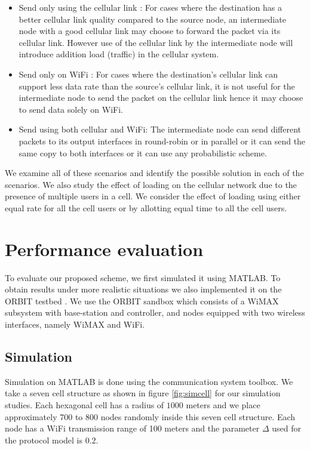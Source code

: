 \documentclass{sig-alternate-10pt}
\begin{document}
\begin{itemize}
  \item Send only using the cellular link : For cases where the destination has a better cellular link quality compared to the source node, an intermediate node with a good cellular link may choose to forward the packet via its cellular link. However use of the cellular link by the intermediate node will introduce addition load (traffic) in the cellular system.  
  \item Send only on WiFi : For cases where the destination's cellular link can support less data rate than the source's cellular link, it is not useful for the intermediate node to send the packet on  the cellular link hence it may choose to send data solely on WiFi.
  \item Send using both cellular and WiFi: The intermediate node can  send different  packets to its output interfaces in round-robin or in parallel or it can send the same copy to both interfaces or it can use any probabilistic scheme. 
\end{itemize}
   

We examine  all of these scenarios and identify the  possible solution in each of the scenarios.
We also study  the effect of loading on the cellular network due to the presence of multiple users in a cell. We consider the effect of loading using either equal rate for all the cell users or by allotting equal time to all the cell users. 




\section{Performance evaluation}
To evaluate our proposed scheme,  we first  simulated it using MATLAB. To  obtain results under more realistic situations we also implemented it on the ORBIT testbed \cite{Raychaudhuri05orbit}. We use the ORBIT sandbox which consists of a WiMAX subsystem with base-station and controller, and nodes equipped with two wireless interfaces, namely WiMAX and WiFi. 

\subsection{Simulation}
Simulation on MATLAB is done using the communication system toolbox. We take a seven cell structure as shown in figure \ref{fig:simcell} for our simulation studies. Each hexagonal cell has a radius of $1000$ meters and we place approximately 700 to 800 nodes randomly inside this seven cell structure. Each node has a WiFi transmission range of 100 meters and the parameter $\Delta$ used for the protocol model  is  $0.2$.
\end{document}
